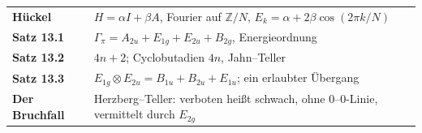 \begin{merksatz}
\begin{center}
\renewcommand{\arraystretch}{1.5}
\begin{tabular}{@{}P{3.0cm}P{5.6cm}@{}}
\toprule
\textbf{Hückel} & $H = \alpha I + \beta A$, Fourier auf $\mathbb Z/N$, $E_k = \alpha + 2\beta\cos(2\pi k/N)$\\
\textbf{Satz 13.1} & $\Gamma_\pi = A_{2u} + E_{1g} + E_{2u} + B_{2g}$, Energieordnung\\
\textbf{Satz 13.2} & $4n + 2$; Cyclobutadien $4n$, Jahn--Teller\\
\textbf{Satz 13.3} & $E_{1g}\otimes E_{2u} = B_{1u} + B_{2u} + E_{1u}$; ein erlaubter Übergang\\
\textbf{Der Bruchfall} & Herzberg--Teller: verboten heißt schwach, ohne $0$--$0$-Linie, vermittelt durch $E_{2g}$\\
\bottomrule
\end{tabular}
\end{center}

\begin{center}
\begin{minipage}{0.88\textwidth}
\end{minipage}
\end{center}
\end{merksatz}
